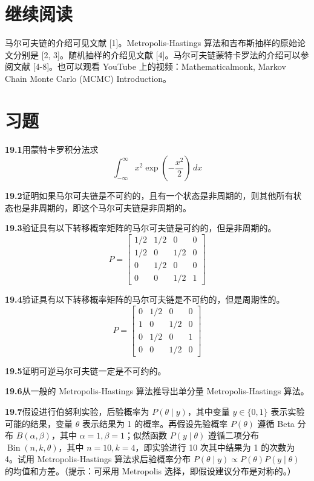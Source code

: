 \documentclass[UTF8, 12pt, fontset=fandol, oneside]{ctexart}
\begin{document}
\section*{继续阅读}

马尔可夫链的介绍可见文献 [1]。Metropolis-Hastings 算法和吉布斯抽样的原始论文分别是 [2, 3]。随机抽样的介绍见文献 [4]。马尔可夫链蒙特卡罗法的介绍可以参阅文献 [4-8]。也可以观看 YouTube 上的视频：Mathematicalmonk, Markov Chain Monte Carlo (MCMC) Introduction。

\section*{习题}

\noindent\textbf{19.1}\quad 用蒙特卡罗积分法求
\[
\int_{-\infty}^{\infty}x^2\exp\left(-\frac{x^2}{2}\right)\,dx
\]

\noindent\textbf{19.2}\quad 证明如果马尔可夫链是不可约的，且有一个状态是非周期的，则其他所有状态也是非周期的，即这个马尔可夫链是非周期的。

\noindent\textbf{19.3}\quad 验证具有以下转移概率矩阵的马尔可夫链是可约的，但是非周期的。
\[
P=
\begin{bmatrix}
1/2 & 1/2 & 0 & 0\\
1/2 & 0 & 1/2 & 0\\
0 & 1/2 & 0 & 0\\
0 & 0 & 1/2 & 1
\end{bmatrix}
\]

\noindent\textbf{19.4}\quad 验证具有以下转移概率矩阵的马尔可夫链是不可约的，但是周期性的。
\[
P=
\begin{bmatrix}
0 & 1/2 & 0 & 0\\
1 & 0 & 1/2 & 0\\
0 & 1/2 & 0 & 1\\
0 & 0 & 1/2 & 0
\end{bmatrix}
\]

\noindent\textbf{19.5}\quad 证明可逆马尔可夫链一定是不可约的。

\noindent\textbf{19.6}\quad 从一般的 Metropolis-Hastings 算法推导出单分量 Metropolis-Hastings 算法。

\noindent\textbf{19.7}\quad 假设进行伯努利实验，后验概率为 $P(\theta\mid y)$，其中变量 $y\in\{0,1\}$ 表示实验可能的结果，变量 $\theta$ 表示结果为 1 的概率。再假设先验概率 $P(\theta)$ 遵循 Beta 分布 $B(\alpha,\beta)$，其中 $\alpha=1,\beta=1$；似然函数 $P(y\mid\theta)$ 遵循二项分布 $\operatorname{Bin}(n,k,\theta)$，其中 $n=10,k=4$，即实验进行 10 次其中结果为 1 的次数为 4。试用 Metropolis-Hastings 算法求后验概率分布 $P(\theta\mid y)\propto P(\theta)P(y\mid\theta)$ 的均值和方差。（提示：可采用 Metropolis 选择，即假设建议分布是对称的。）
\end{document}
